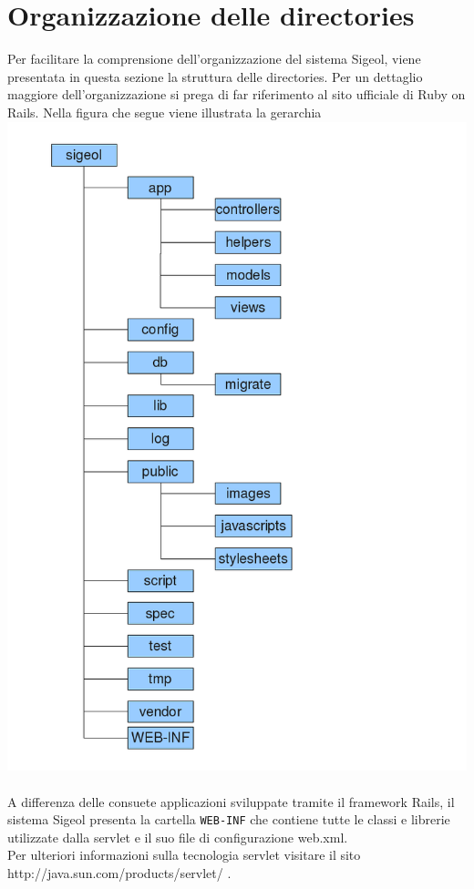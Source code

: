 \documentclass[11pt,a4paper]{article}
\begin{document}
\section{Organizzazione delle directories}
Per facilitare la comprensione dell'organizzazione del sistema Sigeol, viene presentata in questa sezione la struttura delle directories. Per un dettaglio maggiore dell'organizzazione si prega di far riferimento al sito ufficiale di Ruby on Rails. Nella figura che segue viene illustrata la gerarchia \\
\includegraphics[scale=0.59]{images/gerarchiacartelle.png} \\
\\
A differenza delle consuete applicazioni sviluppate tramite il framework Rails, il sistema Sigeol presenta la cartella \verb|WEB-INF| che contiene tutte le classi e librerie utilizzate dalla servlet e il suo file di configurazione web.xml.\\ Per ulteriori informazioni sulla tecnologia servlet visitare il sito \\ http://java.sun.com/products/servlet/ .
\end{document}
